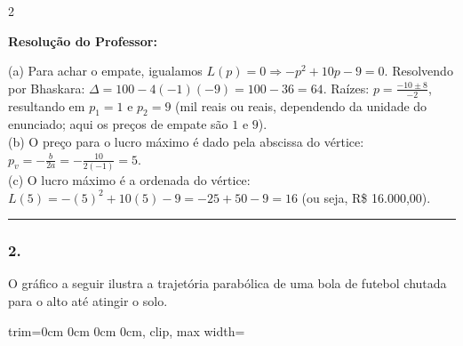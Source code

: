 \begin{multicols*}{2}
\ifgabarito
    \begin{tcolorbox}[colback=CorTitUm!5, colframe=CorTitUm, boxrule=1pt, arc=4pt, left=6pt, right=6pt, top=6pt, bottom=6pt]
    \small\textbf{\textcolor{CorTitUm}{Resolução do Professor:}}\par\vspace{0.1cm}
    \color{CinzaEscuro}
    (a) Para achar o empate, igualamos $L(p) = 0 \Rightarrow -p^2 + 10p - 9 = 0$. Resolvendo por Bhaskara: $\Delta = 100 - 4(-1)(-9) = 100 - 36 = 64$. Raízes: $p = \frac{-10 \pm 8}{-2}$, resultando em $p_1 = 1$ e $p_2 = 9$ (mil reais ou reais, dependendo da unidade do enunciado; aqui os preços de empate são $1$ e $9$). \\
    (b) O preço para o lucro máximo é dado pela abscissa do vértice: $p_v = -\frac{b}{2a} = -\frac{10}{2(-1)} = 5$. \\
    (c) O lucro máximo é a ordenada do vértice: $L(5) = -(5)^2 + 10(5) - 9 = -25 + 50 - 9 = 16$ (ou seja, R\$ 16.000,00).
    \end{tcolorbox}
\fi

\par\vspace{\espacoQuestao}

\noindent\textcolor{CorLinha}{\rule{\linewidth}{0.5pt}} 
\par\vspace{\espacoPreQuestao}
\subsubsection*{2.} O gráfico a seguir ilustra a trajetória parabólica de uma bola de futebol chutada para o alto até atingir o solo.

\begin{center}
\begin{adjustbox}{trim=0cm 0cm 0cm 0cm, clip, max width=\larguraTikz}
\end{adjustbox}
\end{center}


\end{multicols*}
